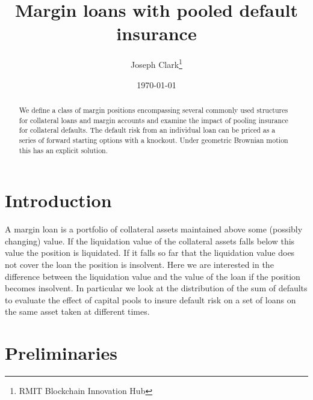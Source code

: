 \documentclass[12pt]{article}
\begin{document}
\begin{titlepage}
\title{Margin loans with pooled default insurance}
\author{Joseph Clark\thanks{RMIT Blockchain Innovation Hub} }
\date{\today}
\maketitle
\begin{abstract}
\noindent We define a class of margin positions encompassing several commonly used structures for collateral loans and margin accounts and examine the impact of pooling insurance for collateral defaults. The default risk from an individual loan can be priced as a series of forward starting options with a knockout. Under geometric Brownian motion this has an explicit solution. 


\bigskip
\end{abstract}
\setcounter{page}{0}
\thispagestyle{empty}
\end{titlepage}
\pagebreak \newpage




\doublespacing


\section{Introduction} \label{sec:introduction}

A margin loan is a portfolio of collateral assets maintained above some (possibly changing) value. If the liquidation value of the collateral assets falls below this value the position is liquidated. If it falls so far that the liquidation value does not cover the loan the position is insolvent. Here we are interested in the difference between the liquidation value and the value of the loan if the position becomes insolvent. In particular we look at the distribution of the sum of defaults to evaluate the effect of capital pools to insure default risk on a set of loans on the same asset taken at different times.



\section{Preliminaries}
\end{document}
